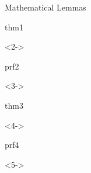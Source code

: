 \def\EMtitlesize{26}\def\EMtitleskip{31}
\begin{frame}{Mathematical Lemmas}
\begin{EMbox}{thm}{1}{}
\begin{uncoverenv}<2->
\end{uncoverenv}
\end{EMbox}
\begin{EMbox}{prf}{2}{}
\begin{uncoverenv}<3->
\end{uncoverenv}
\end{EMbox}
\begin{EMbox}{thm}{3}{}
\begin{uncoverenv}<4->
\end{uncoverenv}
\end{EMbox}
\begin{EMbox}{prf}{4}{}
\begin{uncoverenv}<5->
\end{uncoverenv}
\end{EMbox}
\end{frame}

